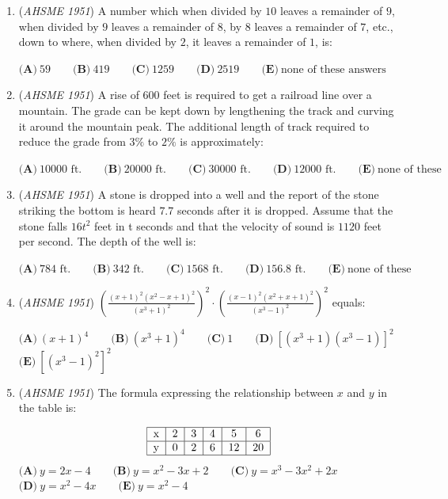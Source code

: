 \begin{enumerate}
	\item (\textit{AHSME 1951}) A number which when divided by $10$ leaves a remainder of $9$, when divided by $9$ leaves a remainder of $8$, by $8$ leaves a remainder of $7$, etc., down to where, when divided by $2$, it leaves a remainder of $1$, is: 


 $\textbf{(A)}\ 59\qquad\textbf{(B)}\ 419\qquad\textbf{(C)}\ 1259\qquad\textbf{(D)}\ 2519\qquad\textbf{(E)}\ \text{none of these answers}$


	\item (\textit{AHSME 1951}) A rise of $600$ feet is required to get a railroad line over a mountain. The grade can be kept down by lengthening the track and curving it around the mountain peak. The additional length of track required to reduce the grade from $3\%$ to $2\%$ is approximately: 


 $\textbf{(A)}\ 10000\text{ ft.}\qquad\textbf{(B)}\ 20000\text{ ft.}\qquad\textbf{(C)}\ 30000\text{ ft.}\qquad\textbf{(D)}\ 12000\text{ ft.}\qquad\textbf{(E)}\ \text{none of these}$


	\item (\textit{AHSME 1951}) A stone is dropped into a well and the report of the stone striking the bottom is heard $7.7$ seconds after it is dropped. Assume that the stone falls $16t^2$ feet in t seconds and that the velocity of sound is $1120$ feet per second. The depth of the well is:


 $\textbf{(A)}\ 784\text{ ft.}\qquad\textbf{(B)}\ 342\text{ ft.}\qquad\textbf{(C)}\ 1568\text{ ft.}\qquad\textbf{(D)}\ 156.8\text{ ft.}\qquad\textbf{(E)}\ \text{none of these}$


	\item (\textit{AHSME 1951}) $\left(\frac{(x+1)^{2}(x^{2}-x+1)^{2}}{(x^{3}+1)^{2}}\right)^{2}\cdot\left(\frac{(x-1)^{2}(x^{2}+x+1)^{2}}{(x^{3}-1)^{2}}\right)^{2}$ equals:


 $\textbf{(A)}\ (x+1)^{4}\qquad\textbf{(B)}\ (x^{3}+1)^{4}\qquad\textbf{(C)}\ 1\qquad\textbf{(D)}\ [(x^{3}+1)(x^{3}-1)]^{2}$
$\textbf{(E)}\ [(x^{3}-1)^{2}]^{2}$


	\item (\textit{AHSME 1951}) The formula expressing the relationship between $x$ and $y$ in the table is:

 \[\begin{tabular}{|c|c|c|c|c|c|}\hline x & 2 & 3 & 4 & 5 & 6\\ \hline y & 0 & 2 & 6 & 12 & 20\\ \hline\end{tabular}\]
$\textbf{(A)}\ y = 2x-4\qquad\textbf{(B)}\ y = x^{2}-3x+2\qquad\textbf{(C)}\ y = x^{3}-3x^{2}+2x$
$\textbf{(D)}\ y = x^{2}-4x\qquad\textbf{(E)}\ y = x^{2}-4$



\end{enumerate}
